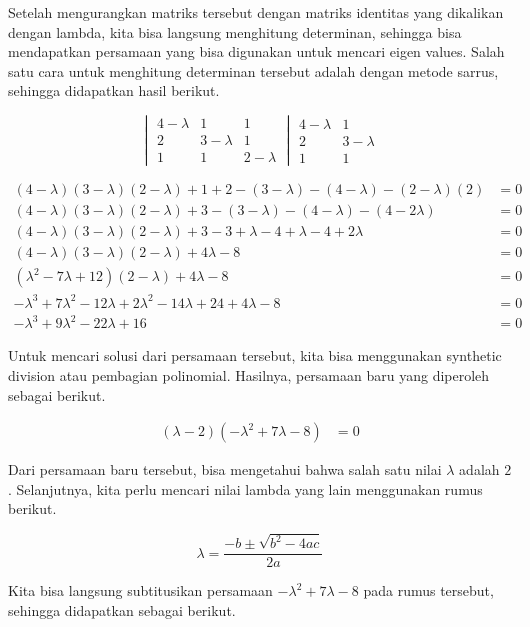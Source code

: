 \documentclass{article}
\begin{document}
Setelah mengurangkan matriks tersebut dengan matriks identitas yang dikalikan dengan lambda, kita bisa langsung menghitung determinan, sehingga bisa mendapatkan persamaan yang bisa digunakan untuk mencari eigen values. Salah satu cara untuk menghitung determinan tersebut adalah dengan metode sarrus, sehingga didapatkan hasil berikut.

$$
\begin{vmatrix}
    4-\lambda & 1 & 1\\
    2 & 3-\lambda & 1\\
    1 & 1 & 2 -\lambda
\end{vmatrix}
\begin{matrix}
    4-\lambda & 1\\
    2 & 3 - \lambda\\
    1 & 1
\end{matrix}
$$

\begin{align*}
    (4-\lambda)(3-\lambda)(2-\lambda)+1+2-(3-\lambda)-(4-\lambda)-(2-\lambda)(2) &= 0\\
    (4-\lambda)(3-\lambda)(2-\lambda)+3-(3-\lambda)-(4-\lambda)-(4-2\lambda) &= 0\\
    (4-\lambda)(3-\lambda)(2-\lambda)+3-3+\lambda-4+\lambda-4+2\lambda &= 0\\
    (4-\lambda)(3-\lambda)(2-\lambda)+4\lambda - 8&= 0\\
    (\lambda^2 -7\lambda + 12)(2-\lambda) + 4\lambda - 8&= 0\\
    -\lambda^3+7\lambda^2-12\lambda+2\lambda^2-14\lambda+24+4\lambda-8&= 0\\
    -\lambda^3+9\lambda^2-22\lambda+16&= 0
\end{align*}

Untuk mencari solusi dari persamaan tersebut, kita bisa menggunakan synthetic division atau pembagian polinomial. Hasilnya, persamaan baru yang diperoleh sebagai berikut.

\begin{align*}
    (\lambda-2)(-\lambda^2+7\lambda-8) &= 0
\end{align*}

Dari persamaan baru tersebut, bisa mengetahui bahwa salah satu nilai $\lambda$ adalah $2$. Selanjutnya, kita perlu mencari nilai lambda yang lain menggunakan rumus berikut.

$$
\lambda = \frac{-b \pm \sqrt{b^2 - 4ac}}{2a}
$$

Kita bisa langsung subtitusikan persamaan $-\lambda^2 +7\lambda - 8$ pada rumus tersebut, sehingga didapatkan sebagai berikut.
\end{document}
